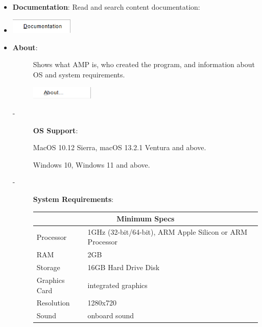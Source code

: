 \documentclass{article}
\begin{document}
\begin{itemize}
    \item \textbf{Documentation}: Read and search content documentation:
    \item[] \includegraphics[width=3cm]{Images/Help Documentation.png}
    \item \textbf{About}:
    \begin{description}
        \item[] Shows what AMP is, who created the program, and information about OS and system requirements.
        \item[] \includegraphics[width=3cm]{Images/Help About.png}
        \item[-] \textbf{OS Support}:        
            \item[]  MacOS 10.12 Sierra, macOS 13.2.1 Ventura and above.
            \item[]  Windows 10, Windows 11 and above.
            \vspace{0.2cm}
        \item[-] \textbf{System Requirements}:

            {
            \begin{tabular}{ |p{3cm}|p{10cm}| }
            \hline
            \multicolumn{2}{|c|}{\textbf{Minimum Specs}} \\
            \hline
            Processor & 1GHz (32-bit/64-bit), ARM Apple Silicon or ARM Processor \\
            RAM & 2GB \\
            Storage & 16GB Hard Drive Disk \\
            Graphics Card & integrated graphics \\
            Resolution & 1280x720 \\
            Sound & onboard sound \\
            \hline
            \end{tabular}

}
\end{description}
\end{itemize}
\end{document}
